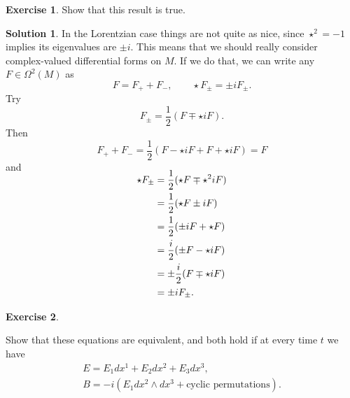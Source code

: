 \documentclass[11pt, a4paper]{report}
\theoremstyle{definition}
\newtheorem{ex}{Exercise}[part]
\newtheorem{sol}{Solution}[part]
\begin{document}
\begin{ex}

Show that this result is true.

\end{ex}

\begin{sol}

In the Lorentzian case things are not quite as nice, since $\star^2 = -1$ implies its eigenvalues are $\pm i$. This means that we should really consider complex-valued differential forms on $M$. If we do that, we can write any $F \in \Omega^2(M)$ as
\[
    F = F_+ + F_-, \qquad
    \star F_\pm = \pm i F_\pm.
\]
Try
\[
    F_\pm = \frac{1}{2} (F \mp \star i F).
\]
Then
\[
    F_+ + F_- = \frac{1}{2} (F - \star i F + F + \star i F) = F
\]
and
\begin{align*}
    \SwapAboveDisplaySkip
    \star F_\pm &= \frac{1}{2}(\star F \mp \star^2 i F) \\
                &= \frac{1}{2}(\star F \pm i F) \\
                &= \frac{1}{2}(\pm i F + \star F) \\
                &= \frac{i}{2}(\pm F - \star i F) \\
                &= \pm \frac{i}{2}(F \mp \star i F) \\
                &= \pm i F_\pm.
\end{align*}

\end{sol}

\begin{ex}\label{ex:ebselfdual}

Show that these equations are equivalent, and both hold if at every time $t$ we have
\begin{gather*}
    E = E_1 dx^1 + E_2 dx^2 + E_3 dx^3, \\
    B = -i (E_1 dx^2 \wedge dx^3 + \text{cyclic permutations}).
\end{gather*}

\end{ex}
\end{document}
